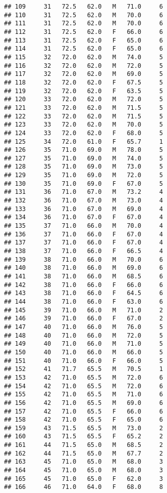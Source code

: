 \documentclass[
]{article}
\begin{document}
\begin{verbatim}
## 109     31   72.5   62.0   M   71.0     6
## 110     31   72.5   62.0   M   70.0     6
## 111     31   72.5   62.0   M   70.0     6
## 112     31   72.5   62.0   F   66.0     6
## 113     31   72.5   62.0   F   65.0     6
## 114     31   72.5   62.0   F   65.0     6
## 115     32   72.0   62.0   M   74.0     5
## 116     32   72.0   62.0   M   72.0     5
## 117     32   72.0   62.0   M   69.0     5
## 118     32   72.0   62.0   F   67.5     5
## 119     32   72.0   62.0   F   63.5     5
## 120     33   72.0   62.0   M   72.0     5
## 121     33   72.0   62.0   M   71.5     5
## 122     33   72.0   62.0   M   71.5     5
## 123     33   72.0   62.0   M   70.0     5
## 124     33   72.0   62.0   F   68.0     5
## 125     34   72.0   61.0   F   65.7     1
## 126     35   71.0   69.0   M   78.0     5
## 127     35   71.0   69.0   M   74.0     5
## 128     35   71.0   69.0   M   73.0     5
## 129     35   71.0   69.0   M   72.0     5
## 130     35   71.0   69.0   F   67.0     5
## 131     36   71.0   67.0   M   73.2     4
## 132     36   71.0   67.0   M   73.0     4
## 133     36   71.0   67.0   M   69.0     4
## 134     36   71.0   67.0   F   67.0     4
## 135     37   71.0   66.0   M   70.0     4
## 136     37   71.0   66.0   F   67.0     4
## 137     37   71.0   66.0   F   67.0     4
## 138     37   71.0   66.0   F   66.5     4
## 139     38   71.0   66.0   M   70.0     6
## 140     38   71.0   66.0   M   69.0     6
## 141     38   71.0   66.0   M   68.5     6
## 142     38   71.0   66.0   F   66.0     6
## 143     38   71.0   66.0   F   64.5     6
## 144     38   71.0   66.0   F   63.0     6
## 145     39   71.0   66.0   M   71.0     2
## 146     39   71.0   66.0   F   67.0     2
## 147     40   71.0   66.0   M   76.0     5
## 148     40   71.0   66.0   M   72.0     5
## 149     40   71.0   66.0   M   71.0     5
## 150     40   71.0   66.0   M   66.0     5
## 151     40   71.0   66.0   F   66.0     5
## 152     41   71.7   65.5   M   70.5     1
## 153     42   71.0   65.5   M   72.0     6
## 154     42   71.0   65.5   M   72.0     6
## 155     42   71.0   65.5   M   71.0     6
## 156     42   71.0   65.5   M   69.0     6
## 157     42   71.0   65.5   F   66.0     6
## 158     42   71.0   65.5   F   65.0     6
## 159     43   71.5   65.5   M   73.0     2
## 160     43   71.5   65.5   F   65.2     2
## 161     44   71.5   65.0   M   68.5     2
## 162     44   71.5   65.0   M   67.7     2
## 163     45   71.0   65.0   M   68.0     3
## 164     45   71.0   65.0   M   68.0     3
## 165     45   71.0   65.0   F   62.0     3
## 166     46   71.0   64.0   F   68.0     8

\end{verbatim}
\end{document}
